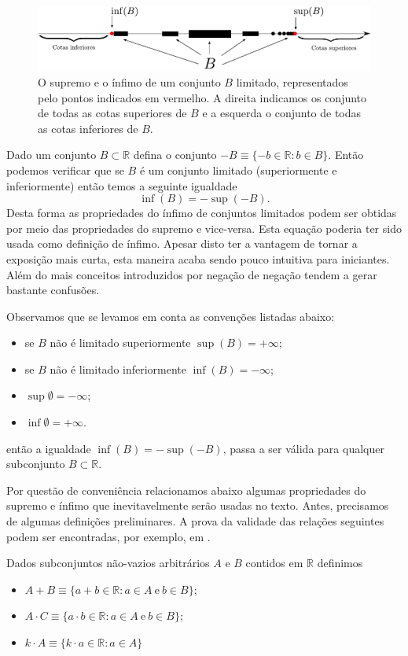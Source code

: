 \begin{subappendices}
\begin{figure}[h]
\centering
\includegraphics[width=0.98\linewidth]{Figuras/supremo-infimo}
\caption{O supremo e o ínfimo de um conjunto $B$ limitado, representados pelo pontos indicados em vermelho. A direita indicamos os conjunto de todas as cotas superiores de $B$ e a esquerda o 
conjunto de todas as cotas inferiores de $B$.}
\label{fig:supremo-infimo}
\end{figure}



Dado um conjunto $B\subset \mathbb{R}$ defina o conjunto $-B\equiv \{-b\in\mathbb{R}: b\in B\}$.
Então podemos verificar que se $B$ é um conjunto limitado (superiormente e inferiormente) então
temos a seguinte igualdade 
\[\inf(B) = - \sup(-B).\] 
Desta forma as propriedades do ínfimo
de conjuntos limitados podem ser obtidas por meio das propriedades do supremo e vice-versa.
Esta equação poderia ter sido usada como definição de ínfimo. Apesar disto ter a vantagem
de tornar a exposição mais curta, esta maneira acaba sendo pouco intuitiva para iniciantes.
Além do mais conceitos introduzidos por negação de negação tendem a gerar bastante confusões. 

Observamos que se levamos em conta as convenções listadas abaixo: 
\begin{itemize}
	\item se $B$ não é limitado superiormente $\sup(B)=+\infty$;
	\item se $B$ não é limitado inferiormente $\inf(B)=-\infty$;
	\item $\sup \emptyset = -\infty$;
	\item $\inf \emptyset = +\infty$.
\end{itemize} 
então a igualdade $\inf(B) = - \sup(-B)$, 
passa a ser válida para qualquer subconjunto $B\subset\mathbb{R}$.


Por questão de conveniência relacionamos abaixo algumas propriedades do supremo e ínfimo
que inevitavelmente serão usadas no texto. Antes, precisamos de algumas definições preliminares.
A prova da validade das relações seguintes podem ser encontradas, por exemplo, em 
\cite{MR0385023}. 

\bigskip 


Dados subconjuntos não-vazios arbitrários $A$ e $B$ contidos em $\mathbb{R}$ definimos
\begin{itemize}
	\item $A+B\equiv \{ a+b\in\mathbb{R}: a\in A\ \text{e}\ b\in B\}$;
	\item $A\cdot C \equiv \{ a\cdot b\in\mathbb{R}: a\in A\ \text{e}\ b\in B\}$;
	\item $k\cdot A \equiv \{k\cdot a\in\mathbb{R}: a\in A \}$
\end{itemize}




\end{subappendices}
